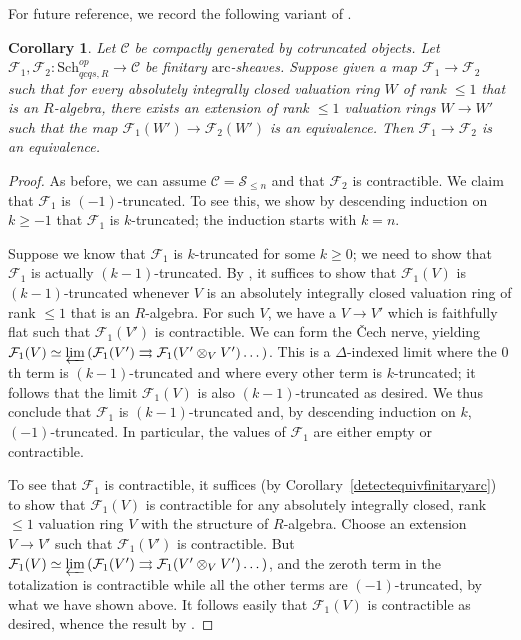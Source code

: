 \documentclass[reqno]{amsart}
\newcommand{\sF}{\mathcal{F}}
\newcommand{\arc}{\mathrm{arc}}
\newtheorem{corollary}[theorem]{Corollary}
\theoremstyle{definition}
\begin{document}
For future reference, we record the following 
variant of . 
\begin{corollary} 
Let $\mathcal{C}$ be compactly generated by cotruncated objects. 
Let $\sF_1, \sF_2\colon  \mathrm{Sch}_{qcqs,R}^{op} \to \mathcal{C}$ be finitary
$\arc$-sheaves. 
Suppose given a map $\sF_1 \to \sF_2$ such that for every absolutely integrally closed valuation ring
$W$ of
rank $\leq 1$ that is an $R$-algebra, 
there exists an extension of rank $\leq 1$ valuation rings $W \to W'$ such that 
the map $\sF_1(W') \to \sF_2( W')$ is an
equivalence. Then $\sF_1\to \sF_2$ is an equivalence. 
\label{completevariantrnk1}
\end{corollary} 
\begin{proof} 
As before, we can assume $\mathcal{C} = \mathcal{S}_{\leq n}$ and that $\sF_2$
is contractible. 
We claim that $\sF_1$ is $(-1)$-truncated. 
To see this, we show by descending induction on $k \geq -1$ that $\sF_1$ is 
$k$-truncated; the induction starts with $k = n$. 

Suppose we know that $\sF_1$ is $k$-truncated for some $k \geq 0$; we need to
show that $\sF_1$ is actually $(k-1)$-truncated. 
By , it suffices to show that 
$\sF_1(V)$ is $(k-1)$-truncated whenever $V$ is an absolutely integrally closed
valuation ring of rank $\leq 1$ that is an $R$-algebra.  
For such $V$, we have a $V \to V'$ which is faithfully flat 
such that 
$\sF_1(V')$ is contractible. 
We can
form the \v{C}ech nerve, yielding 
$\sF_1(V) \simeq \varprojlim \left( \sF_1( V') \rightrightarrows
\sF_1(V' \otimes_V V') \dots \right)$.
This is a $\Delta$-indexed limit 
where the $0$th term is $(k-1)$-truncated and where every other term is
$k$-truncated; it follows that the limit $\sF_1(V)$ is also $(k-1)$-truncated as
desired. 
We thus conclude that $\sF_1$ is $(k-1)$-truncated and, by descending induction on $k$,
$(-1)$-truncated. 
In particular, the values of $\sF_1$ are either empty or contractible. 

To see that 
$\sF_1$ is contractible, 
it suffices (by Corollary~\ref{detectequivfinitaryarc}) to show that 
$\sF_1(V)$ is contractible for any absolutely integrally closed, rank $\leq 1$
valuation ring $V$ with the structure of $R$-algebra. 
Choose an extension $V \to V'$ such that $\sF_1(V')$ is contractible. 
But $\sF_1(V) 
\simeq \varprojlim \left( \sF_1( V') \rightrightarrows
\sF_1(V' \otimes_V V') \dots \right)
$, and the zeroth term in the totalization is contractible while all the other
terms are $(-1)$-truncated, by what we have shown above. It follows easily that $\sF_1(V)$ is contractible as
desired, whence the result by . 
\end{proof} 
\end{document}
